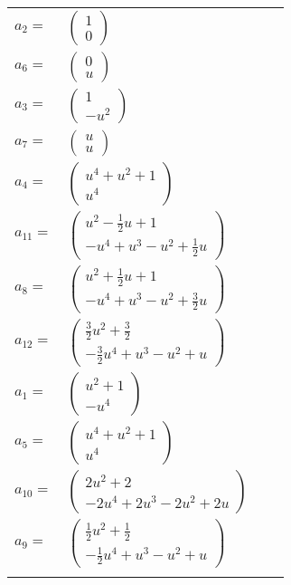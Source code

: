 \documentclass[1p]{elsarticle_modified}
\theoremstyle{definition}
\begin{document}
\begin{tabular}{m{7pt} m{180pt} m{7pt} m{180pt} }
\flushright $a_{2}=$&$\begin{pmatrix}1\\0\end{pmatrix}$ \\
\flushright $a_{6}=$&$\begin{pmatrix}0\\u\end{pmatrix}$ \\
\flushright $a_{3}=$&$\begin{pmatrix}1\\- u^2\end{pmatrix}$ \\
\flushright $a_{7}=$&$\begin{pmatrix}u\\u\end{pmatrix}$ \\
\flushright $a_{4}=$&$\begin{pmatrix}u^4+u^2+1\\u^4\end{pmatrix}$ \\
\flushright $a_{11}=$&$\begin{pmatrix}u^2-\frac{1}{2} u+1\\- u^4+u^3- u^2+\frac{1}{2} u\end{pmatrix}$ \\
\flushright $a_{8}=$&$\begin{pmatrix}u^2+\frac{1}{2} u+1\\- u^4+u^3- u^2+\frac{3}{2} u\end{pmatrix}$ \\
\flushright $a_{12}=$&$\begin{pmatrix}\frac{3}{2} u^2+\frac{3}{2}\\-\frac{3}{2} u^4+u^3- u^2+u\end{pmatrix}$ \\
\flushright $a_{1}=$&$\begin{pmatrix}u^2+1\\- u^4\end{pmatrix}$ \\
\flushright $a_{5}=$&$\begin{pmatrix}u^4+u^2+1\\u^4\end{pmatrix}$ \\
\flushright $a_{10}=$&$\begin{pmatrix}2 u^2+2\\-2 u^4+2 u^3-2 u^2+2 u\end{pmatrix}$ \\
\flushright $a_{9}=$&$\begin{pmatrix}\frac{1}{2} u^2+\frac{1}{2}\\-\frac{1}{2} u^4+u^3- u^2+u\end{pmatrix}$\\&\end{tabular}
\end{document}
